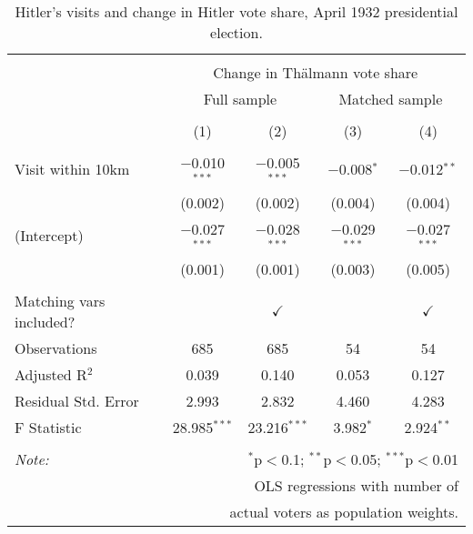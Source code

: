
\begin{table}[!htbp] \centering 
  \caption{Hitler's visits and change in Hitler vote share, April 1932 presidential election.} 
  \label{tab:ols-pres-thae-voteshare} 
\begin{tabular}{@{\extracolsep{5pt}}lcccc} 
\\[-1.8ex]\hline 
\hline \\[-1.8ex] 
 & \multicolumn{4}{c}{Change in Thälmann vote share} \\ 
\cline{2-5} 
 & \multicolumn{2}{c}{Full sample} & \multicolumn{2}{c}{Matched sample} \\ 
\\[-1.8ex] & (1) & (2) & (3) & (4)\\ 
\hline \\[-1.8ex] 
 Visit within 10km & $-$0.010$^{***}$ & $-$0.005$^{***}$ & $-$0.008$^{*}$ & $-$0.012$^{**}$ \\ 
  & (0.002) & (0.002) & (0.004) & (0.004) \\ 
  (Intercept) & $-$0.027$^{***}$ & $-$0.028$^{***}$ & $-$0.029$^{***}$ & $-$0.027$^{***}$ \\ 
  & (0.001) & (0.001) & (0.003) & (0.005) \\ 
 \hline \\[-1.8ex] 
Matching vars included? &  & \multicolumn{1}{c}{$\checkmark$} &  & \multicolumn{1}{c}{$\checkmark$} \\ 
Observations & 685 & 685 & 54 & 54 \\ 
Adjusted R$^{2}$ & 0.039 & 0.140 & 0.053 & 0.127 \\ 
Residual Std. Error & 2.993 & 2.832 & 4.460 & 4.283 \\ 
F Statistic & 28.985$^{***}$ & 23.216$^{***}$ & 3.982$^{*}$ & 2.924$^{**}$ \\ 
\hline 
\hline \\[-1.8ex] 
\textit{Note:}  & \multicolumn{4}{r}{$^{*}$p$<$0.1; $^{**}$p$<$0.05; $^{***}$p$<$0.01} \\ 
 & \multicolumn{4}{r}{OLS regressions with number of} \\ 
 & \multicolumn{4}{r}{actual voters as population weights.} \\ 
\end{tabular} 
\end{table} 
